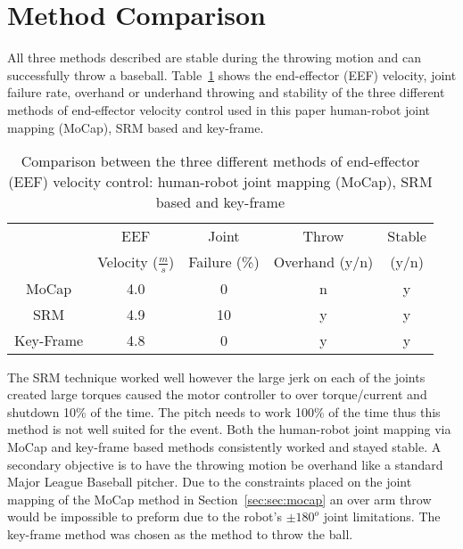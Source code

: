\section{Method Comparison}\label{sec:comparison}
All three methods described are stable during the throwing motion and can successfully throw a baseball.  Table~\ref{table:comp} shows the end-effector (EEF) velocity, joint failure rate, overhand or underhand throwing and stability of the three different methods of end-effector velocity control used in this paper human-robot joint mapping (MoCap), SRM based and key-frame.

\begin{table}[!t]
\renewcommand{\arraystretch}{1.3}
\caption{Comparison between the three different methods of end-effector (EEF) velocity control: human-robot joint mapping (MoCap), SRM based and key-frame}
\label{table:comp}
\centering
\begin{tabular}{|c|c|c|c|c|}
\hline
  				& EEF 																	& Joint 						& Throw						& Stable  			\\
  				& Velocity ($\frac{m}{s}$)							& Failure (\%)			& Overhand (y/n)	& (y/n)					\\
\hline	
MoCap 		& 4.0																		& 0									& n								& y 						\\
\hline
SRM 			& 4.9																		& 10								& y								& y							\\
\hline
Key-Frame & 4.8 																	& 0 								& y								&	y							\\
\hline
\end{tabular}
\end{table}

The SRM technique worked well however the large jerk on each of the joints created large torques caused the motor controller to over torque/current and shutdown 10\% of the time.  
The pitch needs to work 100\% of the time thus this method is not well suited for the event.  
Both the human-robot joint mapping via MoCap and key-frame based methods consistently worked and stayed stable.  A secondary objective is to have the throwing motion be overhand like a standard Major League Baseball pitcher.  
Due to the constraints placed on the joint mapping of the MoCap method in Section~\ref{sec:sec:mocap} an over arm throw would be impossible to preform due to the robot's $\pm180^o$ joint limitations.  The key-frame method was chosen as the method to throw the ball.  
